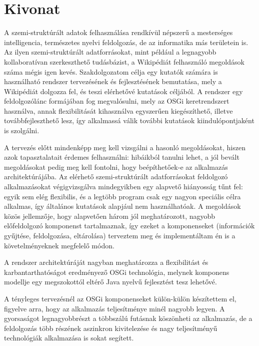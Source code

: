 \chapter*{Kivonat}

A szemi-struktúrált adatok felhasználása rendkívül népszerű a mesterséges intelligencia, természetes nyelvi feldolgozás, de az informatika más területein is. Az ilyen szemi-struktúrált adatforrásokat, mint például a legnagyobb kollaboratívan szerkeszthető tudásbázist, a Wikipédiát felhasználó megoldások száma mégis igen kevés. Szakdolgozatom célja egy kutatók számára is használható rendszer tervezésének és fejlesztésének bemutatása, mely a Wikipédiát dolgozza fel, és teszi elérhetővé kutatások céljából. A rendszer egy feldolgozólánc formájában fog megvalósulni, mely az OSGi keretrendszert használva, annak flexibilitását kihasználva egyszerűen kiegészíthető, illetve továbbfejleszthető lesz, így alkalmassá válik további kutatások kiindulópontjaként is szolgálni.

A tervezés előtt mindenképp meg kell vizsgálni a hasonló megoldásokat, hiszen azok tapasztalatait érdemes felhasználni: hibáikból tanulni lehet, a jól bevált megoldásokat pedig meg kell fontolni, hogy beépíthetőek-e az alkalmazás architektúrájába. Az elérhető szemi-struktúrált adatforrásokat feldolgozó alkalmazásokat végigvizsgálva mindegyikben egy alapvető hiányosság tűnt fel: egyik sem elég flexibilis, és a legtöbb program csak egy nagyon speciális célra alkalmas, így általános kutatások alapjául nem használhatóak. A megoldások közös jellemzője, hogy alapvetően három jól meghatározott, nagyobb előfeldolgozó komponenst tartalmaznak, így ezeket a komponenseket (információk gyűjtése, feldolgozása, eltárolása) terveztem meg és implementáltam én is a követelményeknek megfelelő módon.

A rendszer architektúráját nagyban meghatározza a flexibilitást és karbantarthatóságot eredményező OSGi technológia, melynek komponens modellje egy megszokottól eltérő Java nyelvű fejlesztést tesz lehetővé.

A tényleges tervezésnél az OSGi komponenseket külön-külön készítettem el, figyelve arra, hogy az alkalmazás teljesítménye minél nagyobb legyen. A gyorsaságot legnagyobbrészt a többszálú futásnak köszönheti az alkalmazás, de a feldolgozás több részének aszinkron kivitelezése és nagy teljesítményű technológiák alkalmazása is sokat segített.

